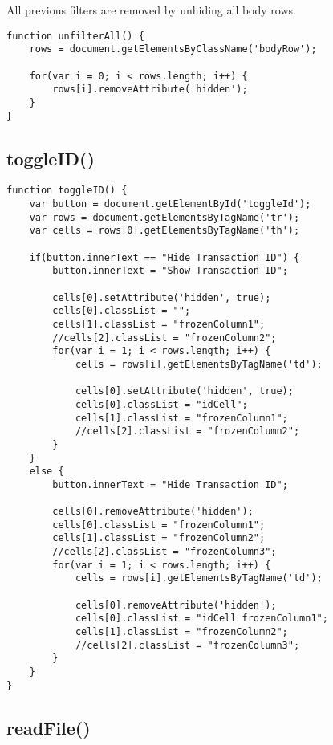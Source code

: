 \documentclass[letterpaper]{article}
\begin{document}
All previous filters are removed by unhiding all body rows.

\begin{lstlisting}[firstnumber=597]
function unfilterAll() {
    rows = document.getElementsByClassName('bodyRow');

    for(var i = 0; i < rows.length; i++) {
        rows[i].removeAttribute('hidden');
    }
}
\end{lstlisting}

\subsection{toggleID()}

\begin{lstlisting}[firstnumber=605]
function toggleID() {
    var button = document.getElementById('toggleId');
    var rows = document.getElementsByTagName('tr');
    var cells = rows[0].getElementsByTagName('th');

    if(button.innerText == "Hide Transaction ID") {
        button.innerText = "Show Transaction ID";

        cells[0].setAttribute('hidden', true);
        cells[0].classList = "";
        cells[1].classList = "frozenColumn1";
        //cells[2].classList = "frozenColumn2";
        for(var i = 1; i < rows.length; i++) {
            cells = rows[i].getElementsByTagName('td');

            cells[0].setAttribute('hidden', true);
            cells[0].classList = "idCell";
            cells[1].classList = "frozenColumn1";
            //cells[2].classList = "frozenColumn2";
        }
    }
    else {
        button.innerText = "Hide Transaction ID";

        cells[0].removeAttribute('hidden');
        cells[0].classList = "frozenColumn1";
        cells[1].classList = "frozenColumn2";
        //cells[2].classList = "frozenColumn3";
        for(var i = 1; i < rows.length; i++) {
            cells = rows[i].getElementsByTagName('td');

            cells[0].removeAttribute('hidden');
            cells[0].classList = "idCell frozenColumn1";
            cells[1].classList = "frozenColumn2";
            //cells[2].classList = "frozenColumn3";
        }
    }
}
\end{lstlisting}

\subsection{readFile()}
\end{document}
